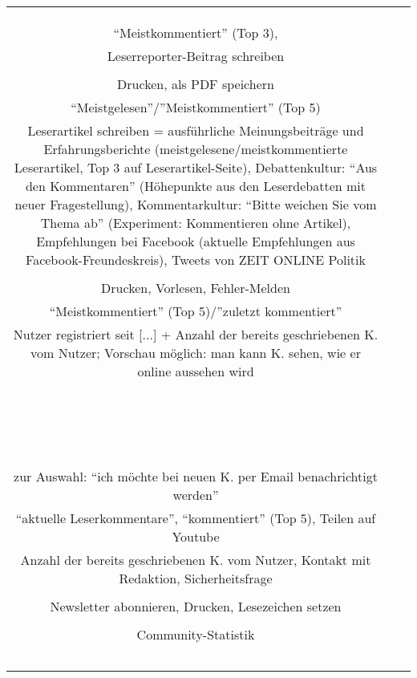 \begin{landscape}
\begin{tabular}{ccc}
{		\\
		&
		\\
		\\
		``Meistkommentiert''  (Top 3), \\
		Leserreporter-Beitrag schreiben \\
		&
		\\
		Drucken, als PDF speichern\\
		``Meistgelesen''/''Meistkommentiert'' (Top 5)\\
		Leserartikel schreiben = ausführliche Meinungsbeiträge und Erfahrungsberichte (meistgelesene/meistkommentierte Leserartikel, Top 3 auf Leserartikel-Seite), Debattenkultur: ``Aus den Kommentaren'' (Höhepunkte aus den Leserdebatten mit neuer Fragestellung), Kommentarkultur: ``Bitte weichen Sie vom Thema ab'' (Experiment: Kommentieren ohne Artikel), Empfehlungen bei Facebook (aktuelle Empfehlungen aus Facebook-Freundeskreis), Tweets von ZEIT ONLINE Politik\\
		&
		\\
		Drucken, Vorlesen, Fehler-Melden\\
		``Meistkommentiert'' (Top 5)/''zuletzt kommentiert''\\
		Nutzer registriert seit [...] + Anzahl der bereits geschriebenen K. vom Nutzer; Vorschau möglich: man kann K. sehen, wie er online aussehen wird\\
		&
		\\
		\\
		\\
		\\
		&
		\\
		\\
		\\
		\\
		&
		\\
		\\
		\\
		\\
		&
		\\
		\\
		\\
		\\
		&
		\\
		zur Auswahl: ``ich möchte bei neuen K. per Email benachrichtigt werden'' \\
		``aktuelle Leserkommentare'', ``kommentiert'' (Top 5), Teilen auf Youtube\\
		Anzahl der bereits geschriebenen K. vom Nutzer, Kontakt mit Redaktion, Sicherheitsfrage\\
		&
		\\
		Newsletter abonnieren, Drucken, Lesezeichen setzen\\
		\\
		Community-Statistik\\
		&
		\\
		\\
		\\
		\\
		&
		
}
\end{tabular}
\end{landscape}
